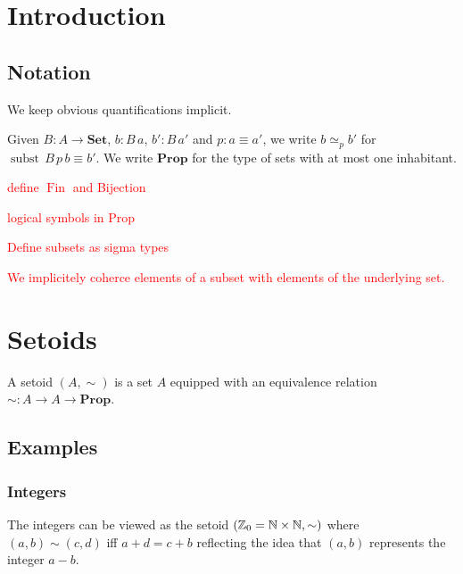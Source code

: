\documentclass{llncs}
\newcommand{\prop}{\mathbf{Prop}}
\DeclareMathOperator*{\subst}{\mathrm{subst}}
\newcommand{\Set}{\mathbf{Set}}
\DeclareMathOperator*{\Fin}{\mathrm{Fin}}
\newcommand{\Z}{\mathbb{Z}}
\newcommand{\todo}[1]{\textcolor{red}{#1}}
\begin{document}

%






\section{Introduction}\label{sec:introduction}
\subsection{Notation}
We keep obvious quantifications implicit.

Given $B : A \to \Set$, $b : B\,a$, $b' : B\,a'$ and $p : a\equiv a'$, we write $b \simeq_{p} b'$ for $\subst\,B\,p\,b \equiv b'$.
We write $\prop$ for the type of sets with at most one inhabitant.

\todo{define $\Fin$ and Bijection}  

\todo{logical symbols in Prop}

\todo{Define subsets as sigma types}

\todo{We implicitely coherce elements of a subset with elements of the underlying set.}

\section{Setoids}\label{sec:setoids}
\begin{definition}
A setoid $(A,\sim)$ is a set $A$ equipped with an equivalence relation $\sim : A \to A \to \prop$.
\end{definition}
\subsection{Examples}\label{sec:setoids:examples}
\subsubsection*{Integers}
The integers can be viewed as the setoid $(\Z_0=\nat\times\nat,\sim)$ where $(a,b)\sim(c,d)$ if{f} $a+d=c+b$ reflecting the idea that $(a,b)$ represents the integer $a-b$.
\end{document}

